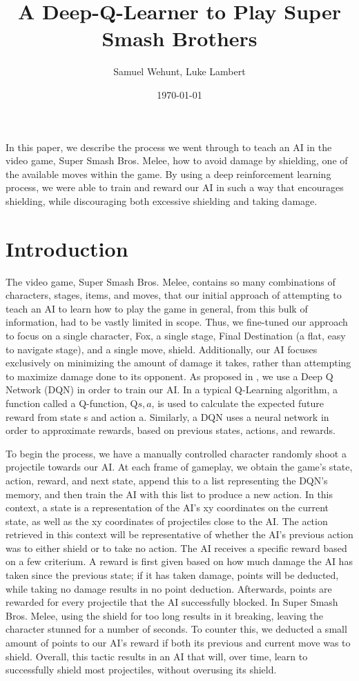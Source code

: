 \documentclass{article}
\date{\today}
\author{Samuel Wehunt, Luke Lambert}
\title{A Deep-Q-Learner to Play Super Smash Brothers}
\begin{document}
\maketitle


In this paper, we describe the process we went through to teach an AI in the video game, Super Smash Bros. Melee, how to avoid damage by shielding, one of the available moves within the game. By using a deep reinforcement learning process, we were able to train and reward our AI in such a way that encourages shielding, while discouraging both excessive shielding and taking damage.  
\section{Introduction}
The video game, Super Smash Bros. Melee, contains so many combinations of characters, stages, items, and moves, that our initial 
approach of attempting to teach an AI to learn how to play the game in general, from this bulk of information, had to be vastly 
limited in scope. Thus, we fine-tuned our approach to focus on a single character, Fox, a single stage, Final Destination (a flat, 
easy to navigate stage), and a single move, shield. Additionally, our AI focuses exclusively on minimizing the amount of damage it 
takes, rather than attempting to maximize damage done to its opponent. As proposed in \cite{atari}, we use a Deep Q Network (DQN) in order to 
train our AI. In a typical Q-Learning algorithm, a function called a Q-function, Q\(s,a\), is used to calculate the expected future reward 
from state s and action a. Similarly, a DQN uses a neural network in order to approximate rewards, based on previous states, actions, and rewards.

To begin the process, we have a manually controlled character randomly shoot a projectile towards our AI. At each frame of gameplay, we obtain 
the game’s state, action, reward, and next state, append this to a list representing the DQN’s memory, and then train the AI with this list to 
produce a new action. In this context, a state is a representation of the AI’s x\/y coordinates on the current state, as well as the x\/y 
coordinates of projectiles close to the AI. The action retrieved in this context will be representative of whether the AI’s previous action was 
to either shield or to take no action. The AI receives a specific reward based on a few criterium. A reward is first given based on how much 
damage the AI has taken since the previous state; if it has taken damage, points will be deducted, while taking no damage results in no point 
deduction. Afterwards, points are rewarded for every projectile that the AI successfully blocked. In Super Smash Bros. Melee, using the shield 
for too long results in it breaking, leaving the character stunned for a number of seconds. To counter this, we deducted a small amount of points 
to our AI’s reward if both its previous and current move was to shield. Overall, this tactic results in an AI that will, over time, learn to successfully 
shield most projectiles, without overusing its shield.
\end{document}
